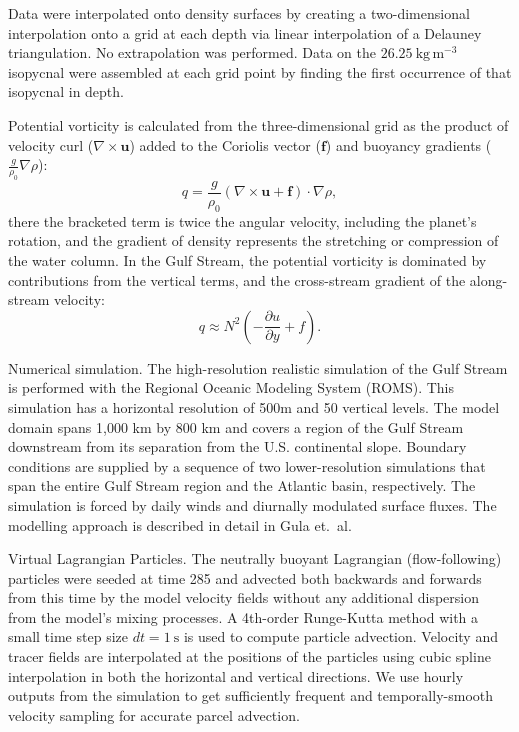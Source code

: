 \documentclass{natureJMK}
\begin{document}
Data were interpolated onto density surfaces by creating a two-dimensional interpolation onto a grid at each depth via linear interpolation of a Delauney triangulation. No extrapolation was performed.  Data on the $26.25\ \mathrm{kg\,m^{-3}}$ isopycnal were assembled at each grid point by finding the first occurrence of that isopycnal in depth.  

Potential vorticity is calculated from the three-dimensional grid as the product of velocity curl ($\nabla\times\mathbf{u}$) added to the Coriolis vector ($\mathbf{f}$) and buoyancy gradients ($\frac{g}{\rho_0}\nabla\rho$):
\begin{equation}
  q = \frac{g}{\rho_0}\left(\nabla\times\mathbf{u}+\mathbf{f}\right) \cdot \nabla\rho,
\end{equation}
there the bracketed term is twice the angular velocity, including the planet's rotation, and the gradient of density represents the stretching or compression of the water column.  In the Gulf Stream, the potential vorticity is dominated by contributions from the vertical terms, and the cross-stream gradient of the along-stream velocity:
\begin{equation}
  q \approx N^2\left(-\frac{\partial u}{\partial y}+f\right).
\end{equation}

Numerical simulation. The high-resolution realistic simulation of the Gulf Stream is performed with the Regional Oceanic Modeling System (ROMS\cite{shchepetkinmcwilliams05}). This simulation has a horizontal resolution of 500m and 50 vertical levels. The model domain spans 1,000 km by 800 km and covers a region of the Gulf Stream downstream from its separation from the U.S. continental slope. Boundary conditions are supplied by a sequence of two lower-resolution simulations that span the entire Gulf Stream region and the Atlantic basin, respectively. The simulation is forced by daily winds and diurnally modulated surface fluxes. The modelling approach is described in detail in Gula et.\ al\cite{gulaetal15}.

Virtual Lagrangian Particles.  The neutrally buoyant Lagrangian (flow-following) particles were seeded at time 285 and advected both backwards and forwards from this time by the model velocity fields without any additional dispersion from the model's mixing processes\cite{gulaetal14}. A 4th-order Runge-Kutta method with a small time step size $dt = 1\ \mathrm{s}$ is used to compute particle advection. Velocity and tracer fields are interpolated at the positions of the particles using cubic spline interpolation in both the horizontal and vertical directions.  We use hourly outputs from the simulation to get sufficiently frequent and temporally-smooth velocity sampling for accurate parcel advection.
\end{document}
